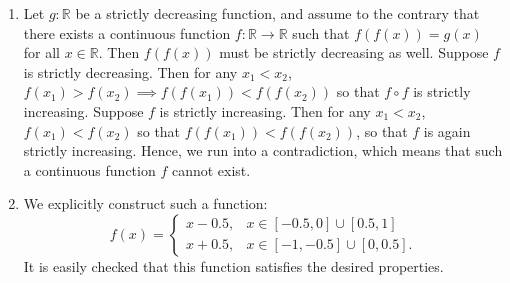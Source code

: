 \documentclass{article}
\begin{document}
\begin{solutions}
	\vspace{-0.35cm}
	\begin{enumerate}[itemsep =-2pt,label = (\alph{*})]
		\item Let $g: \mathbb{R}$ be a strictly decreasing function, and assume to the contrary that there exists a continuous function $f: \mathbb{R} \to \mathbb{R}$ such that $f(f(x)) = g(x)$ for all $x \in \mathbb{R}$. Then $f(f(x))$ must be strictly decreasing as well. Suppose $f$ is strictly decreasing. Then for any $x_{1} < x_{2}$, $f(x_{1}) > f(x_{2}) \implies f(f(x_{1})) < f(f(x_{2}))$ so that $f \circ f$ is strictly increasing. Suppose $f$ is strictly increasing. Then for any $x_{1} < x_{2}$, $f(x_{1}) < f(x_{2})$ so that $f(f(x_{1})) < f(f(x_{2}))$, so that $f$ is again strictly increasing. Hence, we run into a contradiction, which means that such a continuous function $f$ cannot exist. 
		\item We explicitly construct such a function: 
			\begin{equation}
				f(x) = 
					\begin{cases}
						x - 0.5, & x \in [-0.5, 0] \cup [0.5,1] \\
						x + 0.5, & x \in [-1,-0.5] \cup [0,0.5]. 
					\end{cases}
			\end{equation}
		It is easily checked that this function satisfies the desired properties.
	\end{enumerate}
\end{solutions} 

\newpage 
\end{document}
